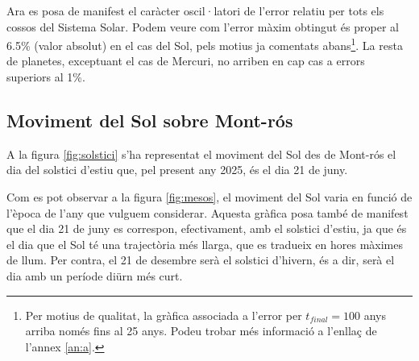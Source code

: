 \documentclass[10pt, twoside, a4paper]{article}
\begin{document}
Ara es posa de manifest el caràcter oscil·latori de l'error relatiu per tots els cossos del Sistema Solar. Podem veure com l'error màxim obtingut és proper al 6.5\% (valor absolut) en el cas del Sol, pels motius ja comentats abans\footnote{Per motius de qualitat, la gràfica associada a l'error per $t_{final}=100$ anys arriba només fins al 25 anys. Podeu trobar més informació a l'enllaç de l'annex \ref{an:a}.}. La resta de planetes, exceptuant el cas de Mercuri, no arriben en cap cas a errors superiors al 1\%.

\subsection{Moviment del Sol sobre Mont-rós}
A la figura \ref{fig:solstici} s'ha representat el moviment del Sol des de Mont-rós el dia del solstici d'estiu que, pel present any 2025, és el dia 21 de juny.

Com es pot observar a la figura \ref{fig:mesos}, el moviment del Sol varia en funció de l'època de l'any que vulguem considerar. Aquesta gràfica posa també de manifest que el dia 21 de juny es correspon, efectivament, amb el solstici d'estiu, ja que és el dia que el Sol té una trajectòria més llarga, que es tradueix en hores màximes de llum. Per contra, el 21 de desembre serà el solstici d'hivern, és a dir, serà el dia amb un període diürn més curt.
\end{document}
